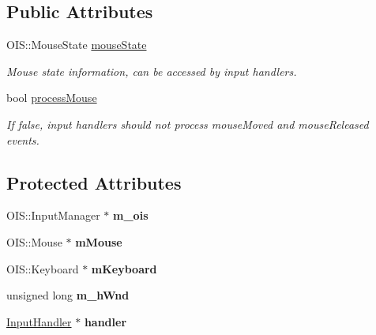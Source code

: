 \subsection*{\-Public \-Attributes}
\begin{DoxyCompactItemize}
\item 
\hypertarget{classInputManager_acc28ea87d6d5ef326713c701a6ff78e9}{
\-O\-I\-S\-::\-Mouse\-State \hyperlink{classInputManager_acc28ea87d6d5ef326713c701a6ff78e9}{mouse\-State}}
\label{d5/d39/classInputManager_acc28ea87d6d5ef326713c701a6ff78e9}

\begin{DoxyCompactList}\small\item\em \-Mouse state information, can be accessed by input handlers. \end{DoxyCompactList}\item 
\hypertarget{classInputManager_a60e0707d7d0069d5bfaf5fe968302726}{
bool \hyperlink{classInputManager_a60e0707d7d0069d5bfaf5fe968302726}{process\-Mouse}}
\label{d5/d39/classInputManager_a60e0707d7d0069d5bfaf5fe968302726}

\begin{DoxyCompactList}\small\item\em \-If false, input handlers should not process mouse\-Moved and mouse\-Released events. \end{DoxyCompactList}\end{DoxyCompactItemize}
\subsection*{\-Protected \-Attributes}
\begin{DoxyCompactItemize}
\item 
\hypertarget{classInputManager_a339e02e0d2e405c1107ecf57f6a14c2f}{
\-O\-I\-S\-::\-Input\-Manager $\ast$ {\bfseries m\-\_\-ois}}
\label{d5/d39/classInputManager_a339e02e0d2e405c1107ecf57f6a14c2f}

\item 
\hypertarget{classInputManager_a8c44ba031e327eb7d6b58d0164381f84}{
\-O\-I\-S\-::\-Mouse $\ast$ {\bfseries m\-Mouse}}
\label{d5/d39/classInputManager_a8c44ba031e327eb7d6b58d0164381f84}

\item 
\hypertarget{classInputManager_af4b794dea8a8e3cd3edf9a1272827cf3}{
\-O\-I\-S\-::\-Keyboard $\ast$ {\bfseries m\-Keyboard}}
\label{d5/d39/classInputManager_af4b794dea8a8e3cd3edf9a1272827cf3}

\item 
\hypertarget{classInputManager_a2f4211be345369a1388ed132d5c47639}{
unsigned long {\bfseries m\-\_\-h\-Wnd}}
\label{d5/d39/classInputManager_a2f4211be345369a1388ed132d5c47639}

\item 
\hypertarget{classInputManager_aad48b24997e308a49325aa23ae9cbeae}{
\hyperlink{classInputHandler}{\-Input\-Handler} $\ast$ {\bfseries handler}}
\label{d5/d39/classInputManager_aad48b24997e308a49325aa23ae9cbeae}

\end{DoxyCompactItemize}


